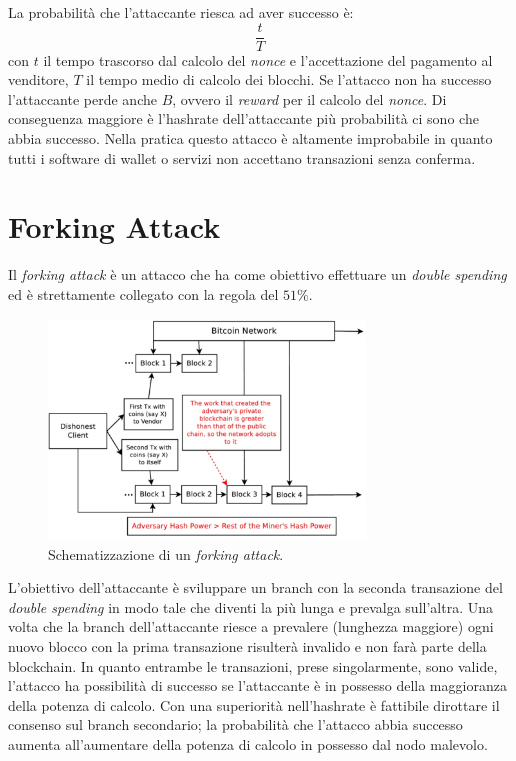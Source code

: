 La probabilità che l'attaccante riesca ad aver successo è:
\begin{equation}
    \frac{t}{T}
\end{equation}
con $t$ il tempo trascorso dal calcolo del \textit{nonce} e l'accettazione del pagamento al venditore, $T$ il tempo medio di calcolo dei blocchi. Se l'attacco non ha successo l'attaccante perde anche $B$, ovvero il \textit{reward} per il calcolo del \textit{nonce}.\newline
Di conseguenza maggiore è l'hashrate dell'attaccante più probabilità ci sono che abbia successo. Nella pratica questo attacco è altamente improbabile in quanto tutti i software di wallet o servizi non accettano transazioni senza conferma.
\clearpage

\section{Forking Attack}
Il \textit{forking attack} è un attacco che ha come obiettivo effettuare un \textit{double spending} ed è strettamente collegato con la regola del $51\%$.
\begin{figure}[H]
    \centering
    \includegraphics[width=0.75\textwidth]{images/forkingattack.png}
    \caption{Schematizzazione di un \textit{forking attack}.}
\end{figure}
L'obiettivo dell'attaccante è sviluppare un branch con la seconda transazione del \textit{double spending} in modo tale che diventi la più lunga e prevalga sull'altra. Una volta che la branch dell'attaccante riesce a prevalere (lunghezza maggiore) ogni nuovo blocco con la prima transazione risulterà invalido e non farà parte della blockchain.\newline
In quanto entrambe le transazioni, prese singolarmente, sono valide, l'attacco ha possibilità di successo se l'attaccante è in possesso della maggioranza della potenza di calcolo. Con una superiorità nell'hashrate è fattibile dirottare il consenso sul branch secondario; la probabilità che l'attacco abbia successo aumenta all'aumentare della potenza di calcolo in possesso dal nodo malevolo.
